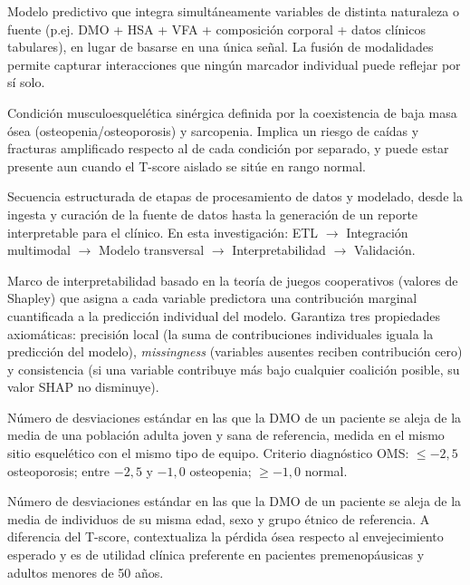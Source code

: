 \documentclass[../tesis.tex]{subfiles}
\begin{document}
\begin{description}[font=\bfseries, leftmargin=4cm, style=nextline]
    \item[Modelo multimodal]
    Modelo predictivo que integra simultáneamente variables de distinta naturaleza o fuente
    (p.ej. DMO + HSA + VFA + composición corporal + datos clínicos tabulares), en lugar de
    basarse en una única señal. La fusión de modalidades permite capturar interacciones que
    ningún marcador individual puede reflejar por sí solo.

    \item[Osteosarcopenia]
    Condición musculoesquelética sinérgica definida por la coexistencia de baja masa ósea
    (osteopenia/osteoporosis) y sarcopenia. Implica un riesgo de caídas y fracturas
    amplificado respecto al de cada condición por separado, y puede estar presente aun cuando
    el T-score aislado se sitúe en rango normal.

    \item[\textit{Pipeline} metodológico]
    Secuencia estructurada de etapas de procesamiento de datos y modelado, desde la ingesta
    y curación de la fuente de datos hasta la generación de un reporte interpretable para el
    clínico.     En esta investigación: ETL $\rightarrow$ Integración multimodal $\rightarrow$
    Modelo transversal $\rightarrow$ Interpretabilidad $\rightarrow$ Validación.

    \item[SHAP (\textit{SHapley Additive exPlanations})]
    Marco de interpretabilidad basado en la teoría de juegos cooperativos (valores de Shapley)
    que asigna a cada variable predictora una contribución marginal cuantificada a la predicción
    individual del modelo. Garantiza tres propiedades axiomáticas: precisión local (la suma de
    contribuciones individuales iguala la predicción del modelo), \textit{missingness} (variables
    ausentes reciben contribución cero) y consistencia (si una variable contribuye más bajo
    cualquier coalición posible, su valor SHAP no disminuye).

    \item[T-score]
    Número de desviaciones estándar en las que la DMO de un paciente se aleja de la media de una
    población adulta joven y sana de referencia, medida en el mismo sitio esquelético con el mismo
    tipo de equipo. Criterio diagnóstico OMS: $\leq -2{,}5$ osteoporosis; entre $-2{,}5$ y
    $-1{,}0$ osteopenia; $\geq -1{,}0$ normal.

    \item[Z-score]
    Número de desviaciones estándar en las que la DMO de un paciente se aleja de la media de
    individuos de su misma edad, sexo y grupo étnico de referencia. A diferencia del T-score,
    contextualiza la pérdida ósea respecto al envejecimiento esperado y es de utilidad clínica
    preferente en pacientes premenopáusicas y adultos menores de 50 años.

\end{description}
    \newpage
\end{document}
